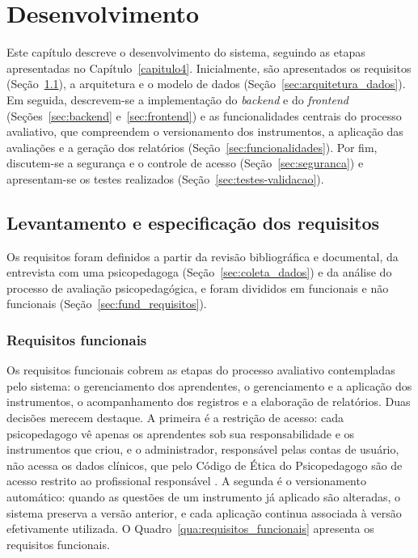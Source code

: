 \chapter[Desenvolvimento]{Desenvolvimento}\label{capitulo5}

Este capítulo descreve o desenvolvimento do sistema, seguindo as etapas apresentadas no Capítulo~\ref{capitulo4}. Inicialmente, são apresentados os requisitos (Seção~\ref{sec:requisitos}), a arquitetura e o modelo de dados (Seção~\ref{sec:arquitetura_dados}). Em seguida, descrevem-se a implementação do \textit{backend} e do \textit{frontend} (Seções~\ref{sec:backend} e~\ref{sec:frontend}) e as funcionalidades centrais do processo avaliativo, que compreendem o versionamento dos instrumentos, a aplicação das avaliações e a geração dos relatórios (Seção~\ref{sec:funcionalidades}). Por fim, discutem-se a segurança e o controle de acesso (Seção~\ref{sec:seguranca}) e apresentam-se os testes realizados (Seção~\ref{sec:testes-validacao}).


\section{Levantamento e especificação dos requisitos}\label{sec:requisitos}

Os requisitos foram definidos a partir da revisão bibliográfica e documental, da entrevista com uma psicopedagoga (Seção~\ref{sec:coleta_dados}) e da análise do processo de avaliação psicopedagógica, e foram divididos em funcionais e não funcionais (Seção~\ref{sec:fund_requisitos}).

\subsection{Requisitos funcionais}

Os requisitos funcionais cobrem as etapas do processo avaliativo contempladas pelo sistema: o gerenciamento dos aprendentes, o gerenciamento e a aplicação dos instrumentos, o acompanhamento dos registros e a elaboração de relatórios. Duas decisões merecem destaque. A primeira é a restrição de acesso: cada psicopedagogo vê apenas os aprendentes sob sua responsabilidade e os instrumentos que criou, e o administrador, responsável pelas contas de usuário, não acessa os dados clínicos, que pelo Código de Ética do Psicopedagogo são de acesso restrito ao profissional responsável \cite{abpp2019_codigo_etica}. A segunda é o versionamento automático: quando as questões de um instrumento já aplicado são alteradas, o sistema preserva a versão anterior, e cada aplicação continua associada à versão efetivamente utilizada. O Quadro~\ref{qua:requisitos_funcionais} apresenta os requisitos funcionais.

